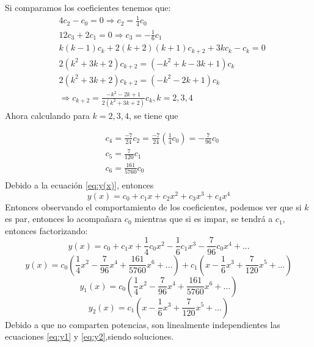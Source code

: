 Si comparamos los coeficientes tenemos que:
\begin{equation*}
\begin{split}
     &4c_{2}-c_{0}=0 \Rightarrow c_{2}=\frac{1}{4}c_{0}\\
     &12c_{3}+2c_{1}=0 \Rightarrow c_{3}=-\frac{1}{6}c_{1}\\
     &k(k-1) c_{k}+2(k+2)(k+1) c_{k+2}+3 k c_{k}-c_{k}=0\\
     &2\left(k^{2}+3 k+2\right) c_{k+2}=\left(-k^{2}+k-3 k+1\right) c_{k}\\
     &2\left(k^{2}+3 k+2\right) c_{k+2}=\left(-k^{2}-2 k+1\right) c_{k}\\
    &\Rightarrow 
     c_{k+2}=\frac{-k^{2}-2 k+1}{2\left(k^{2}+3 k+2\right)} c_{k}, k=2,3,4
\end{split}
\end{equation*}
Ahora calculando para $k=2,3,4$, se tiene que

\begin{equation*}
\begin{split}
    &c_{4}=\frac{-7}{24}c_{2}=\frac{-7}{24}(\frac{1}{4}c_{0})=-\frac{7}{96}c_{0}\\
    &c_{5}=\frac{7}{120}c_{1}\\
    &c_{6}=\frac{161}{5760}c_{0}\\
\end{split}
\end{equation*}
Debido a la ecuación \ref{eq:y(x)}, entonces
\begin{equation*}
    y(x)=c_{0}+c_{1}x+c_{2}x^{2}+c_{3}x^{3}+c_{4}x^{4}
\end{equation*}
Entonces observando el comportamiento de los coeficientes, podemos ver que si $k$ es par, entonces lo acompañara $c_{0}$ mientras que si es impar, se tendrá a $c_{1}$, entonces factorizando:
\begin{equation*}
    y(x)=c_{0}+c_{1}x+\frac{1}{4}c_{0}x^{2}-\frac{1}{6}c_{1}x^{3}-\frac{7}{96}c_{0}x^{4}+...
\end{equation*}
\begin{equation*}
    y(x)=c_{0}(\frac{1}{4}x^{2}-\frac{7}{96}x^{4}+\frac{161}{5760}x^{6}+...)+c_{1}(x-\frac{1}{6}x^{3}+\frac{7}{120}x^{5}+...)
\end{equation*}
\begin{equation}
    y_{1}(x)=c_{0}(\frac{1}{4}x^{2}-\frac{7}{96}x^{4}+\frac{161}{5760}x^{6}+...)
    \label{eq:y1}
\end{equation}
\begin{equation}
     y_{2}(x)=c_{1}(x-\frac{1}{6}x^{3}+\frac{7}{120}x^{5}+...)
     \label{eq:y2}
\end{equation}
Debido a que no comparten potencias, son linealmente independientes las ecuaciones \ref{eq:y1} y \ref{eq:y2},siendo soluciones.
